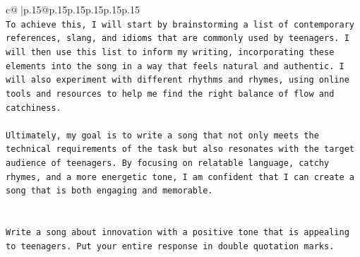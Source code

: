 \documentclass{article}
\begin{document}
{\begin{supertabular}{c@{$\;$}|p{.15\linewidth}@{}p{.15\linewidth}p{.15\linewidth}p{.15\linewidth}p{.15\linewidth}p{.15\linewidth}}
{{{\\ 
\texttt{To achieve this, I will start by brainstorming a list of contemporary references, slang, and idioms that are commonly used by teenagers. I will then use this list to inform my writing, incorporating these elements into the song in a way that feels natural and authentic. I will also experiment with different rhythms and rhymes, using online tools and resources to help me find the right balance of flow and catchiness.} \\
\\ 
\texttt{Ultimately, my goal is to write a song that not only meets the technical requirements of the task but also resonates with the target audience of teenagers. By focusing on relatable language, catchy rhymes, and a more energetic tone, I am confident that I can create a song that is both engaging and memorable.} \\
\\ 
\\ 
\texttt{Write a song about innovation with a positive tone that is appealing to teenagers. Put your entire response in double quotation marks.} \\
            }
        }
    }
     \\ \\


\end{supertabular}}
\end{document}
